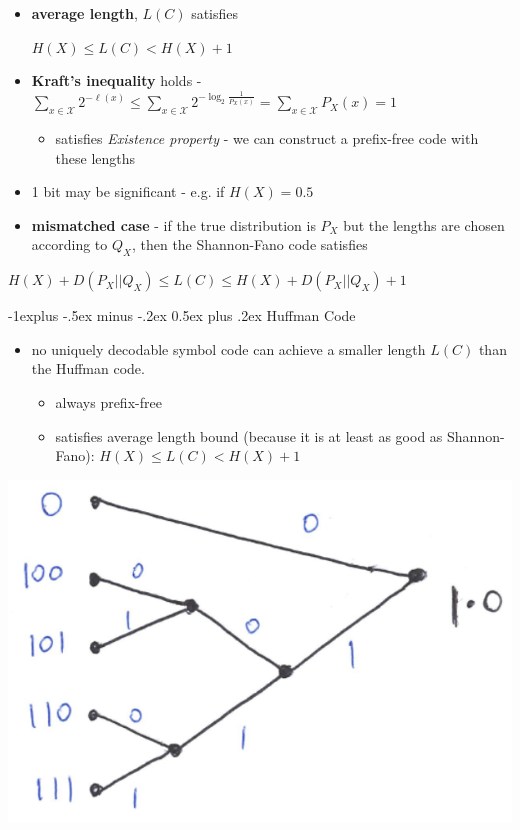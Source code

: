 \documentclass[10pt, landscape]{article}
\makeatletter
\renewcommand{\subsection}{\@startsection{subsection}{2}{0mm}%
  {-1explus -.5ex minus -.2ex}%
  {0.5ex plus .2ex}%
{\normalfont\normalsize\bfseries}}
\makeatother
\begin{document}
\begin{multicols*}{4}
  \begin{itemize}
    \item \textbf{average length}, $L(C)$ satisfies
      \begin{tightcenter}
        $H(X) \leq L(C) < H(X) + 1$
      \end{tightcenter}
    \item \textbf{Kraft's inequality} holds - 
      \( {\displaystyle{ \sum_{x \in \mathcal{X}} 2^{-\ell (x)} 
      \leq \sum_{x \in \mathcal{X}} 2^{-\log_2 \frac{1}{P_X(x)} } = \sum_{x \in \mathcal{X}} P_X(x) = 1 }} \) 
      \begin{itemize}
        \item satisfies \textit{Existence property} - we can construct a prefix-free code with these lengths 
      \end{itemize}
    \item 1 bit may be significant - e.g. if $H(X)=0.5$
    \item \textbf{mismatched case} - if the true distribution is $P_X$ but the lengths are chosen according to $Q_X$, 
      then the Shannon-Fano code satisfies
  \end{itemize}
  \begin{tightcenter}
    $H(X) + D(P_X \vert \vert Q_X) \leq L(C) \leq H(X) + D(P_X \vert \vert Q_X) + 1$
  \end{tightcenter}


  \subsection{Huffman Code}

  \begin{itemize}
    \item no uniquely decodable symbol code can achieve a smaller length $L(C)$ than the Huffman code.
      \begin{itemize}
        \item always prefix-free
        \item satisfies average length bound (because it is at least as good as Shannon-Fano):
          $H(X) \leq L(C) < H(X) + 1$
      \end{itemize}
  \end{itemize}

  \begin{tightcenter}
    \includegraphics[width=0.6\linewidth]{cd3236-huffman-code-tree.png} 
  \end{tightcenter}


\end{multicols*}
\end{document}
